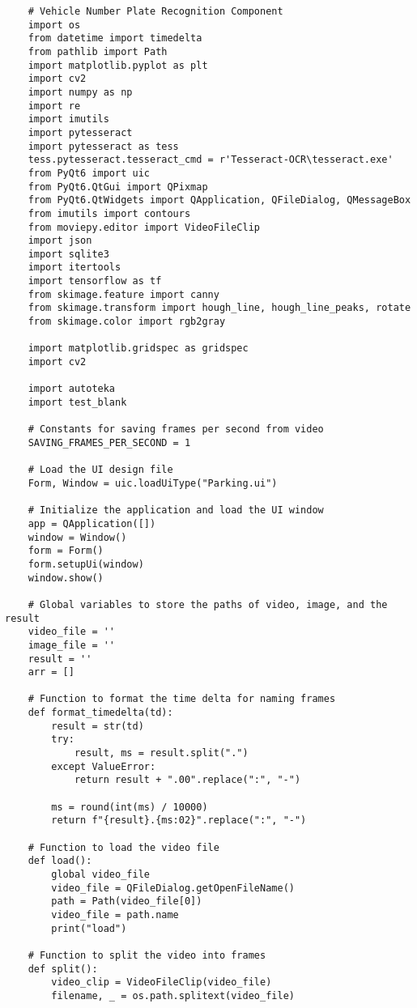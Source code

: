 \begin{lstlisting}
    # Vehicle Number Plate Recognition Component
    import os
    from datetime import timedelta
    from pathlib import Path
    import matplotlib.pyplot as plt
    import cv2
    import numpy as np
    import re
    import imutils
    import pytesseract
    import pytesseract as tess
    tess.pytesseract.tesseract_cmd = r'Tesseract-OCR\tesseract.exe'
    from PyQt6 import uic
    from PyQt6.QtGui import QPixmap
    from PyQt6.QtWidgets import QApplication, QFileDialog, QMessageBox
    from imutils import contours
    from moviepy.editor import VideoFileClip
    import json
    import sqlite3
    import itertools
    import tensorflow as tf
    from skimage.feature import canny
    from skimage.transform import hough_line, hough_line_peaks, rotate
    from skimage.color import rgb2gray

    import matplotlib.gridspec as gridspec
    import cv2

    import autoteka
    import test_blank

    # Constants for saving frames per second from video
    SAVING_FRAMES_PER_SECOND = 1

    # Load the UI design file
    Form, Window = uic.loadUiType("Parking.ui")

    # Initialize the application and load the UI window
    app = QApplication([])
    window = Window()
    form = Form()
    form.setupUi(window)
    window.show()

    # Global variables to store the paths of video, image, and the result
    video_file = ''
    image_file = ''
    result = ''
    arr = []

    # Function to format the time delta for naming frames
    def format_timedelta(td):
        result = str(td)
        try:
            result, ms = result.split(".")
        except ValueError:
            return result + ".00".replace(":", "-")

        ms = round(int(ms) / 10000)
        return f"{result}.{ms:02}".replace(":", "-")

    # Function to load the video file
    def load():
        global video_file
        video_file = QFileDialog.getOpenFileName()
        path = Path(video_file[0])
        video_file = path.name
        print("load")

    # Function to split the video into frames
    def split():
        video_clip = VideoFileClip(video_file)
        filename, _ = os.path.splitext(video_file)


\end{lstlisting}
